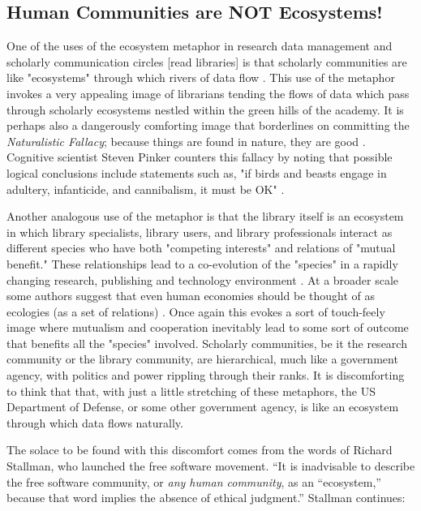 \subsection{Human Communities are NOT Ecosystems!}

One of the uses of the ecosystem metaphor in research data management and scholarly communication circles [read libraries] is that scholarly communities are like "ecosystems" through which rivers of data flow \citep{choudhury_2010}. This use of the metaphor invokes a very appealing image of librarians tending the flows of data which pass through scholarly ecosystems nestled within the green hills of the academy. It is perhaps also a dangerously comforting image that borderlines on committing the \textit{Naturalistic Fallacy}; because things are found in nature, they are good \citep[see][p. 68 for a similar example in business]{lucas_2012}. Cognitive scientist Steven Pinker counters this fallacy by noting that possible logical conclusions include statements such as, "if birds and beasts engage in adultery, infanticide, and cannibalism, it must be OK" \citep{pinker_2002}. 

Another analogous use of the metaphor is that the library itself is an ecosystem in which library specialists, library users, and library professionals interact as different species who have both "competing interests" and relations of "mutual benefit." These relationships lead to a co-evolution of the "species" in a rapidly changing research, publishing and technology environment \citep{walter_2008}. At a broader scale some authors suggest that even human economies should be thought of as ecologies (as a set of relations) \citep[][p. 72]{lucas_2012}. Once again this evokes a sort of touch-feely image where mutualism and cooperation inevitably lead to some sort of outcome that benefits all the "species" involved. Scholarly communities, be it the research community or the library community, are hierarchical, much like a government agency, with politics and power rippling through their ranks. It is discomforting to think that that, with just a little stretching of these metaphors, the US Department of Defense, or some other government agency, is like an ecosystem through which data flows naturally. 

The solace to be found with this discomfort comes from the words of Richard Stallman, who launched the free software movement. “It is inadvisable to describe the free software community, or \textit{any human community}, as an “ecosystem,” because that word implies the absence of ethical judgment.”  Stallman continues:
 
